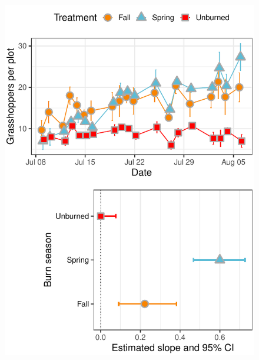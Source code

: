 \documentclass[referee, 
	            sn-basic]
           {sn-jnl}
\begin{document}
\begin{linenumbers}
\begin{figure}
	\centering
	\includegraphics{tau_gg-1.pdf}
	\caption{ } %
	\label{tau} %
\end{figure}

\end{linenumbers}
\end{document}
